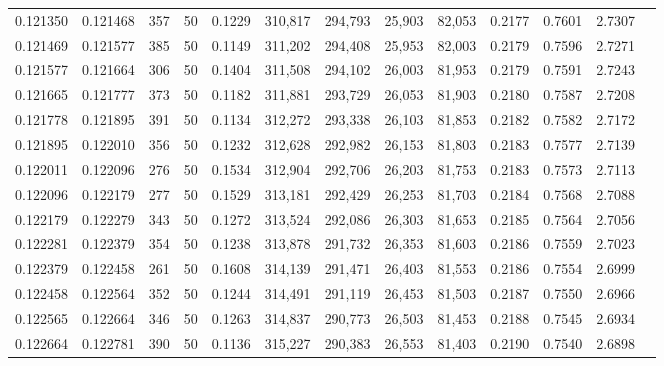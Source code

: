 \begin{tabular}{rrrrrrrrrrrrr}
0.121350 & 0.121468 &   357 &  50 &                                     0.1229 & 310,817 & 294,793 &  25,903 &  82,053 & 0.2177 & 0.7601 & 2.7307 \\
0.121469 & 0.121577 &   385 &  50 &                                     0.1149 & 311,202 & 294,408 &  25,953 &  82,003 & 0.2179 & 0.7596 & 2.7271 \\
0.121577 & 0.121664 &   306 &  50 &                                     0.1404 & 311,508 & 294,102 &  26,003 &  81,953 & 0.2179 & 0.7591 & 2.7243 \\
0.121665 & 0.121777 &   373 &  50 &                                     0.1182 & 311,881 & 293,729 &  26,053 &  81,903 & 0.2180 & 0.7587 & 2.7208 \\
0.121778 & 0.121895 &   391 &  50 &                                     0.1134 & 312,272 & 293,338 &  26,103 &  81,853 & 0.2182 & 0.7582 & 2.7172 \\
0.121895 & 0.122010 &   356 &  50 &                                     0.1232 & 312,628 & 292,982 &  26,153 &  81,803 & 0.2183 & 0.7577 & 2.7139 \\
0.122011 & 0.122096 &   276 &  50 &                                     0.1534 & 312,904 & 292,706 &  26,203 &  81,753 & 0.2183 & 0.7573 & 2.7113 \\
0.122096 & 0.122179 &   277 &  50 &                                     0.1529 & 313,181 & 292,429 &  26,253 &  81,703 & 0.2184 & 0.7568 & 2.7088 \\
0.122179 & 0.122279 &   343 &  50 &                                     0.1272 & 313,524 & 292,086 &  26,303 &  81,653 & 0.2185 & 0.7564 & 2.7056 \\
0.122281 & 0.122379 &   354 &  50 &                                     0.1238 & 313,878 & 291,732 &  26,353 &  81,603 & 0.2186 & 0.7559 & 2.7023 \\
0.122379 & 0.122458 &   261 &  50 &                                     0.1608 & 314,139 & 291,471 &  26,403 &  81,553 & 0.2186 & 0.7554 & 2.6999 \\
0.122458 & 0.122564 &   352 &  50 &                                     0.1244 & 314,491 & 291,119 &  26,453 &  81,503 & 0.2187 & 0.7550 & 2.6966 \\
0.122565 & 0.122664 &   346 &  50 &                                     0.1263 & 314,837 & 290,773 &  26,503 &  81,453 & 0.2188 & 0.7545 & 2.6934 \\
0.122664 & 0.122781 &   390 &  50 &                                     0.1136 & 315,227 & 290,383 &  26,553 &  81,403 & 0.2190 & 0.7540 & 2.6898 \\

\end{tabular}
